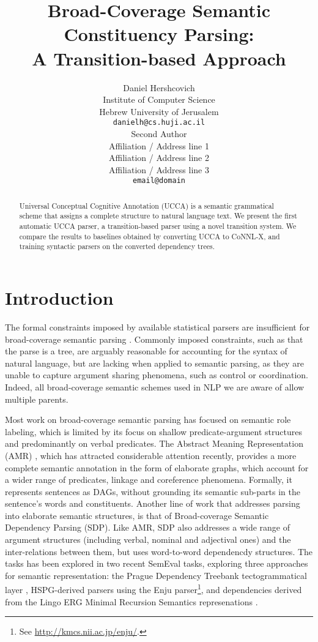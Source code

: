 \documentclass[11pt]{article}
\title{Broad-Coverage Semantic Constituency Parsing: \\ A Transition-based Approach}
\author{Daniel Hershcovich \\
  Institute of Computer Science \\
  Hebrew University of Jerusalem \\
  {\tt danielh@cs.huji.ac.il} \\
  \And
  Second Author \\
  Affiliation / Address line 1 \\
  Affiliation / Address line 2 \\
  Affiliation / Address line 3 \\
  {\tt email@domain} \\
}
\date{}
\begin{document}
\maketitle
\begin{abstract}

  Universal Conceptual Cognitive Annotation (UCCA) is a semantic grammatical scheme that assigns 
  a complete structure to natural language text. We present the first automatic UCCA parser, 
  a transition-based parser using a novel transition system. We compare the results to baselines 
  obtained by converting UCCA to CoNNL-X, and training syntactic parsers on the converted
  dependency trees.
  
\end{abstract}

\section{Introduction}

The formal constraints imposed by available statistical parsers are insufficient for
broad-coverage semantic parsing \cite{oepen2015semeval}.
Commonly imposed constraints, such as that the parse is a tree, are arguably reasonable for
accounting for the syntax of natural language, but are lacking when applied to semantic parsing,
as they are unable to capture argument sharing phenomena, such as control or coordination.
Indeed, all broad-coverage semantic schemes used in NLP we are aware of allow multiple parents.

Most work on broad-coverage semantic parsing has focused on semantic role labeling,
which is limited by its focus on shallow predicate-argument structures and predominantly on verbal
predicates. The Abstract Meaning Representation (AMR) \cite{banarescu2013abstract},
which has attracted considerable attention recently,
provides a more complete semantic annotation in the form of elaborate graphs,
which account for a wider range of predicates, linkage and coreference phenomena.
Formally, it represents sentences as DAGs, without grounding its
semantic sub-parts in the sentence's words and constituents.
Another line of work that addresses parsing into elaborate semantic structures,
is that of Broad-coverage Semantic Dependency Parsing \cite{oepen2014semeval,oepen2015semeval} (SDP).
Like AMR, SDP also addresses a wide range of argument structures (including verbal, nominal and adjectival ones)
and the inter-relations between them, but uses word-to-word dependencdy structures.
The tasks has been explored in two recent SemEval tasks, exploring three approaches
for semantic representation: the Prague
Dependency Treebank tectogrammatical layer \cite{bohmova2003prague},
HSPG-derived parsers using the Enju parser\footnote{See \url{http://kmcs.nii.ac.jp/enju/}.},
and dependencies derived from the Lingo ERG
Minimal Recursion Semantics represenations \cite{Flic:02}.
\end{document}
